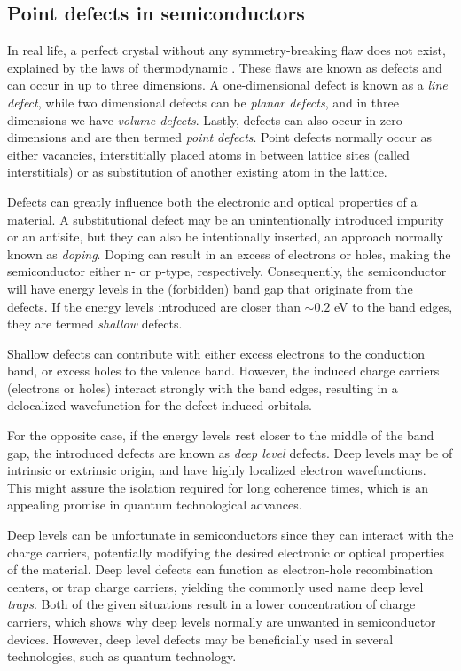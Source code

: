 \subsection{Point defects in semiconductors}

In real life, a perfect crystal without any symmetry-breaking flaw does not exist, explained by the laws of thermodynamic \cite{CharlesKittel2012}. These flaws are known as defects and can occur in up to three dimensions. A one-dimensional defect is known as a \textit{line defect}, while two dimensional defects can be \textit{planar defects}, and in three dimensions we have \textit{volume defects}. Lastly, defects can also occur in zero dimensions and are then termed \textit{point defects}. Point defects normally occur as either vacancies, interstitially placed atoms in between lattice sites (called interstitials) or as substitution of another existing atom in the lattice.

Defects can greatly influence both the electronic and optical properties of a material. A substitutional defect may be an unintentionally introduced impurity or an antisite, but they can also be intentionally inserted, an approach normally known as \textit{doping}. Doping can result in an excess of electrons or holes, making the semiconductor either n- or p-type, respectively. Consequently, the semiconductor will have energy levels in the (forbidden) band gap that originate from the defects. If the energy levels introduced are closer than $ \sim 0.2$ eV to the band edges, they are termed \textit{shallow} defects.

Shallow defects can contribute with either excess electrons to the conduction band, or excess holes to the valence band. However, the induced charge carriers (electrons or holes) interact strongly with the band edges, resulting in a delocalized wavefunction for the defect-induced orbitals.%

For the opposite case, if the energy levels rest closer to the middle of the band gap, the introduced defects are known as \textit{deep level} defects. Deep levels may be of intrinsic or extrinsic origin, %
and have highly localized electron wavefunctions. This might assure the isolation required for long coherence times, which is an appealing promise in quantum technological advances.

Deep levels can be unfortunate in semiconductors since they can interact with the charge carriers, potentially modifying the desired electronic or optical properties of the material. Deep level defects can function as electron-hole recombination centers, or trap charge carriers, yielding the commonly used name deep level \textit{traps}. Both of the given situations result in a lower concentration of charge carriers, which shows why deep levels normally are unwanted in semiconductor devices. %
However, deep level defects may be beneficially used in several technologies, such as quantum technology. %

